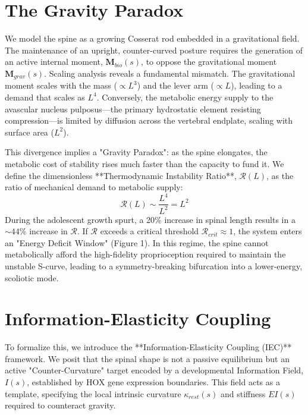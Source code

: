 \documentclass[12pt]{article}
\begin{document}
\section*{The Gravity Paradox}

We model the spine as a growing Cosserat rod embedded in a gravitational field. The maintenance of an upright, counter-curved posture requires the generation of an active internal moment, $\mathbf{M}_{bio}(s)$, to oppose the gravitational moment $\mathbf{M}_{grav}(s)$. Scaling analysis reveals a fundamental mismatch. The gravitational moment scales with the mass ($\propto L^3$) and the lever arm ($\propto L$), leading to a demand that scales as $L^4$. Conversely, the metabolic energy supply to the avascular nucleus pulposus---the primary hydrostatic element resisting compression---is limited by diffusion across the vertebral endplate, scaling with surface area ($L^2$).

This divergence implies a "Gravity Paradox": as the spine elongates, the metabolic cost of stability rises much faster than the capacity to fund it. We define the dimensionless **Thermodynamic Instability Ratio**, $\mathcal{R}(L)$, as the ratio of mechanical demand to metabolic supply:
\begin{equation}
\mathcal{R}(L) \sim \frac{L^4}{L^2} = L^2
\end{equation}
During the adolescent growth spurt, a 20\% increase in spinal length results in a $\sim 44\%$ increase in $\mathcal{R}$. If $\mathcal{R}$ exceeds a critical threshold $\mathcal{R}_{crit} \approx 1$, the system enters an "Energy Deficit Window" (Figure 1). In this regime, the spine cannot metabolically afford the high-fidelity proprioception required to maintain the unstable S-curve, leading to a symmetry-breaking bifurcation into a lower-energy, scoliotic mode.

\section*{Information-Elasticity Coupling}

To formalize this, we introduce the **Information-Elasticity Coupling (IEC)** framework. We posit that the spinal shape is not a passive equilibrium but an active "Counter-Curvature" target encoded by a developmental Information Field, $I(s)$, established by HOX gene expression boundaries. This field acts as a template, specifying the local intrinsic curvature $\kappa_{rest}(s)$ and stiffness $EI(s)$ required to counteract gravity.
\end{document}
